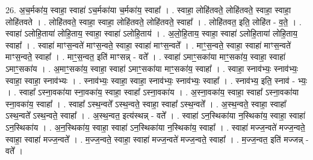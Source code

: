 \documentclass[17pt]{extarticle}
\begin{document}
26. अ॒च॒र्मका॑य॒ स्वाहा॒ स्वाहा॑ ऽच॒र्मका॑या च॒र्मका॑य॒ स्वाहा᳚ । . स्वाहा॒ लोहि॑तवते॒ लोहि॑तवते॒ स्वाहा॒ स्वाहा॒ लोहि॑तवते । . लोहि॑तवते॒ स्वाहा॒ स्वाहा॒ लोहि॑तवते॒ लोहि॑तवते॒ स्वाहा᳚ । . लोहि॑तवत॒ इति॒ लोहि॑त - व॒ते॒ । . स्वाहा॑ ऽलोहि॒ताया॑ लोहि॒ताय॒ स्वाहा॒ स्वाहा॑ ऽलोहि॒ताय॑ । . अ॒लो॒हि॒ताय॒ स्वाहा॒ स्वाहा॑ ऽलोहि॒ताया॑ लोहि॒ताय॒ स्वाहा᳚ । . स्वाहा॑ माꣳस॒न्वते॑ माꣳस॒न्वते॒ स्वाहा॒ स्वाहा॑ माꣳस॒न्वते᳚ । . माꣳ॒॒स॒न्वते॒ स्वाहा॒ स्वाहा॑ माꣳस॒न्वते॑ माꣳस॒न्वते॒ स्वाहा᳚ । . माꣳ॒॒स॒न्वत॒ इति॑ माꣳसन्न् - वते᳚ । . स्वाहा॑ ऽमाꣳ॒॒सका॑या माꣳ॒॒सका॑य॒ स्वाहा॒ स्वाहा॑ ऽमाꣳ॒॒सका॑य । . अ॒माꣳ॒॒सका॑य॒ स्वाहा॒ स्वाहा॑ ऽमाꣳ॒॒सका॑या माꣳ॒॒सका॑य॒ स्वाहा᳚ । . स्वाहा॒ स्नाव॑भ्यः॒ स्नाव॑भ्यः॒ स्वाहा॒ स्वाहा॒ स्नाव॑भ्यः । . स्नाव॑भ्यः॒ स्वाहा॒ स्वाहा॒ स्नाव॑भ्यः॒ स्नाव॑भ्यः॒ स्वाहा᳚ । . स्नाव॑भ्य॒ इति॒ स्नाव॑ - भ्यः॒ । . स्वाहा᳚ ऽस्ना॒वका॑या स्ना॒वका॑य॒ स्वाहा॒ स्वाहा᳚ ऽस्ना॒वका॑य । . अ॒स्ना॒वका॑य॒ स्वाहा॒ स्वाहा᳚ ऽस्ना॒वका॑या स्ना॒वका॑य॒ स्वाहा᳚ । . स्वाहा᳚ ऽस्थ॒न्वते᳚ ऽस्थ॒न्वते॒ स्वाहा॒ स्वाहा᳚ ऽस्थ॒न्वते᳚ । . अ॒स्थ॒न्वते॒ स्वाहा॒ स्वाहा᳚ ऽस्थ॒न्वते᳚ ऽस्थ॒न्वते॒ स्वाहा᳚ । . अ॒स्थ॒न्वत॒ इत्य॑स्थन्न् - वते᳚ । . स्वाहा॑ ऽन॒स्थिका॑या न॒स्थिका॑य॒ स्वाहा॒ स्वाहा॑ ऽन॒स्थिका॑य । . अ॒न॒स्थिका॑य॒ स्वाहा॒ स्वाहा॑ ऽन॒स्थिका॑या न॒स्थिका॑य॒ स्वाहा᳚ । . स्वाहा॑ मज्ज॒न्वते॑ मज्ज॒न्वते॒ स्वाहा॒ स्वाहा॑ मज्ज॒न्वते᳚ । . म॒ज्ज॒न्वते॒ स्वाहा॒ स्वाहा॑ मज्ज॒न्वते॑ मज्ज॒न्वते॒ स्वाहा᳚ । . म॒ज्ज॒न्वत॒ इति॑ मज्जन्न् - वते᳚ । \newline
\end{document}
